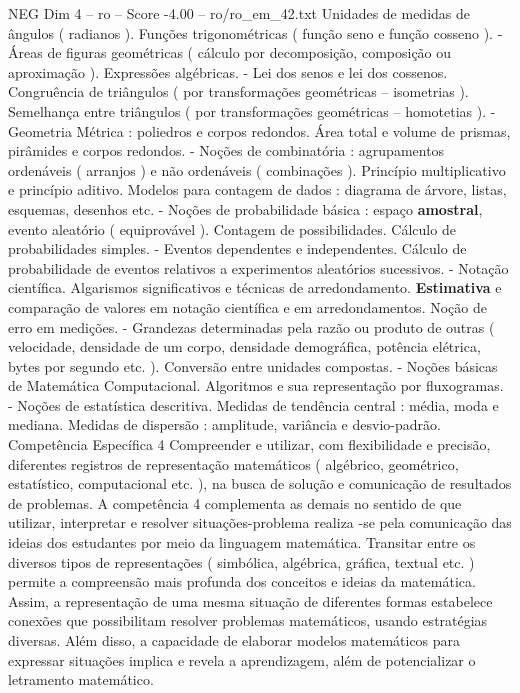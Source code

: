 \begin{textsample}{NEG Dim 4 – ro – Score -4.00 – ro/ro\_em\_42.txt}
Unidades de medidas de ângulos ( radianos ).
Funções trigonométricas ( função seno e função cosseno ). - Áreas de figuras geométricas ( cálculo por decomposição, composição ou aproximação ).
Expressões algébricas. - Lei dos senos e lei dos cossenos.
Congruência de triângulos ( por transformações geométricas – isometrias ).
Semelhança entre triângulos ( por transformações geométricas – homotetias ). - Geometria Métrica : poliedros e corpos redondos.
Área total e volume de prismas, pirâmides e corpos redondos. - Noções de combinatória : agrupamentos ordenáveis ( arranjos ) e não ordenáveis ( combinações ).
Princípio multiplicativo e princípio aditivo.
Modelos para contagem de dados : diagrama de árvore, listas, esquemas, desenhos etc. - Noções de probabilidade básica : espaço \textbf{amostral}, evento aleatório ( equiprovável ).
Contagem de possibilidades.
Cálculo de probabilidades simples. - Eventos dependentes e independentes.
Cálculo de probabilidade de eventos relativos a experimentos aleatórios sucessivos. - Notação científica.
Algarismos significativos e técnicas de arredondamento. \textbf{Estimativa} e comparação de valores em notação científica e em arredondamentos.
Noção de erro em medições. - Grandezas determinadas pela razão ou produto de outras ( velocidade, densidade de um corpo, densidade demográfica, potência elétrica, bytes por segundo etc. ).
Conversão entre unidades compostas. - Noções básicas de Matemática Computacional.
Algoritmos e sua representação por fluxogramas. - Noções de estatística descritiva.
Medidas de tendência central : média, moda e mediana.
Medidas de dispersão : amplitude, variância e desvio-padrão.
Competência Específica 4 Compreender e utilizar, com flexibilidade e precisão, diferentes registros de representação matemáticos ( algébrico, geométrico, estatístico, computacional etc. ), na busca de solução e comunicação de resultados de problemas.
A competência 4 complementa as demais no sentido de que utilizar, interpretar e resolver situações-problema realiza -se pela comunicação das ideias dos estudantes por meio da linguagem matemática.
Transitar entre os diversos tipos de representações ( simbólica, algébrica, gráfica, textual etc. ) permite a compreensão mais profunda dos conceitos e ideias da matemática.
Assim, a representação de uma mesma situação de diferentes formas estabelece conexões que possibilitam resolver problemas matemáticos, usando estratégias diversas.
Além disso, a capacidade de elaborar modelos matemáticos para expressar situações implica e revela a aprendizagem, além de potencializar o letramento matemático.

\end{textsample}
